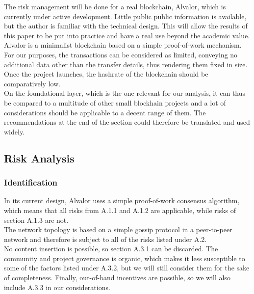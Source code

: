\documentclass[12pt,a4paper]{article}
\begin{document}
The risk management will be done for a real \gls{blockchain}, Alvalor, which is currently under active development. Little public public information is available, but the author is familiar with the technical design. This will allow the results of this paper to be put into practice and have a real use beyond the academic value.\\

Alvalor is a minimalist \gls{blockchain} based on a simple proof-of-work mechanism. For our purposes, the transactions can be considered as limited, conveying no additional data other than the transfer details, thus rendering them fixed in size. Once the project launches, the \gls{hashrate} of the \gls{blockchain} should be comparatively low.\\

On the foundational layer, which is the one relevant for our analysis, it can thus be compared to a multitude of other small blockhain projects and a lot of considerations should be applicable to a decent range of them. The recommendations at the end of the section could therefore be translated and used widely.\\

\subsection{Risk Analysis}

\subsubsection{Identification}

In its current design, Alvalor uses a simple proof-of-work consensus algorithm, which means that all risks from A.1.1 and A.1.2 are applicable, while risks of section A.1.3 are not.\\

The network topology is based on a simple gossip protocol in a peer-to-peer network and therefore is subject to all of the risks listed under A.2.\\

No content insertion is possible, so section A.3.1 can be discarded. The community and project governance is organic, which makes it less susceptible to some of the factors listed under A.3.2, but we will still consider them for the sake of completeness. Finally, out-of-band incentives are possible, so we will also include A.3.3 in our considerations.\\
\end{document}
